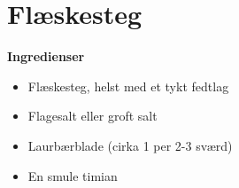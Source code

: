 \documentclass{book}
\begin{document}
\newpage {}
\newpage \section{Flæskesteg}
\begin{minipage}[t]{0.5\textwidth}
\textbf{Ingredienser}
\begin{itemize}
    \item Flæskesteg, helst med et tykt fedtlag
    \item Flagesalt eller groft salt
    \item Laurbærblade (cirka 1 per 2-3 sværd)
    \item En smule timian
\end{itemize}
\end{minipage}
\end{document}
